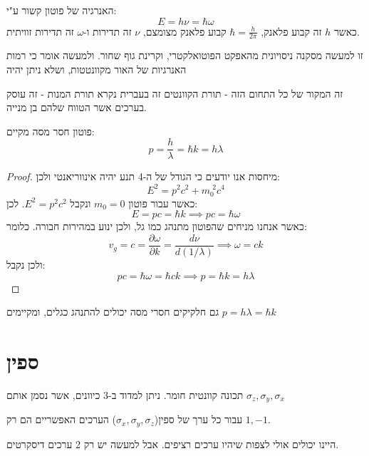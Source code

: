 \documentclass{tstextbook}
\begin{document}
\begin{theorem}
האנרגיה של פוטון קשור ע"י:
$$E = h \nu = \hbar \omega$$
כאשר \(h\) זה קבוע פלאנק, \(\hbar=\frac{h}{2\pi}\) קבוע פלאנק מצומצם, \(\nu\) זה תדירות ו-\(\omega\) זה תדירות זוויתית.

\end{theorem}
\begin{remark}
זו למעשה מסקנה ניסויונית מהאפקט הפוטואלקטרי, וקרינת גוף שחור. ולמעשה אומר כי רמות האנרגיות של האור מקוונטטות, ושלא ניתן יהיה

\end{remark}
\begin{remark}
זה המקור של כל התחום הזה - תורת הקוונטים זה בעברית נקרא תורת המנות - זה עוסק בערכים אשר הטווח שלהם בן מנייה.

\end{remark}
\begin{proposition}
פוטון חסר מסה מקיים:
$$p=\frac{h}{\lambda}=\hbar k=h\lambda$$

\end{proposition}
\begin{proof}
מיחסות אנו יודעים כי הגודל של ה-4 תנע יהיה אינווריאנטי ולכן:
$$E^{2}=p^{2}c^{2}+m_{0}^{\,\,2}c^{4}$$
כאשר עבור פוטון \(m_{0}=0\) ונקבל \(E^2=p^2c^2\). לכן:
$$E=pc=\hbar k\implies pc=\hbar \omega$$
כאשר אנחנו מניחים שהפוטון מתנהג כמו גל, ולכן ינוע במהירות חבורה. כלומר:
$$v_{g}=c= {\frac{\partial\omega}{\partial k}}={\frac{d\nu}{d\left( 1/\lambda \right)}}\implies \omega=ck$$
ולכן נקבל:
$$pc=\hbar \omega=\hbar ck\implies p=\hbar k=h\lambda$$

\end{proof}
\begin{theorem}[דה ברויי]
גם חלקיקים חסרי מסה יכולים להתנהג כגלים, ומקיימים \(p=h\lambda=\hbar k\)

\end{theorem}
\section{ספין}

\begin{definition}[ספין]
תכונה קוונטית חומר. ניתן למדוד ב-3 כיוונים, אשר נסמן אותם \(\sigma_{z},\sigma_{y},\sigma_{x}\)

\end{definition}
\begin{proposition}
עבור כל ערך של ספין(\(\sigma _{x},\sigma_{y},\sigma_{z}\)) הערכים האפשריים הם רק \(1,-1\).

\end{proposition}
היינו יכולים אולי לצפות שיהיו ערכים רציפים. אבל למעשה יש רק 2 ערכים דיסקרטים.
\end{document}
